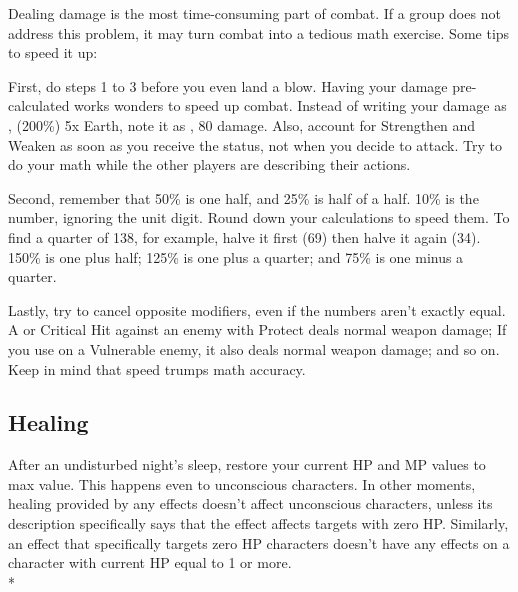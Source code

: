 \begin{multicols}{2}
\begin{boco}
Dealing damage is the most time-consuming part of combat. If a group does not address this problem, it may turn combat into a tedious math exercise. Some tips to speed it up:

First, do steps 1 to 3 before you even land a blow. Having your damage pre-calculated works wonders to speed up combat. Instead of writing your damage as , (200\%) 5x Earth, note it as , 80 damage. Also, account for Strengthen and Weaken as soon as you receive the status, not when you decide to attack. Try to do your math while the other players are describing their actions.

Second, remember that 50\% is one half, and 25\% is half of a half. 10\% is the number, ignoring the unit digit. Round down your calculations to speed them. To find a quarter of 138, for example, halve it first (69) then halve it again (34). 150\% is one plus half; 125\% is one plus a quarter; and 75\% is one minus a quarter.

Lastly, try to cancel opposite modifiers, even if the numbers aren't exactly equal. A  or Critical Hit against an enemy with Protect deals normal weapon damage; If you use  on a Vulnerable enemy, it also deals normal weapon damage; and so on. Keep in mind that speed trumps math accuracy.
\end{boco}

\subsection{Healing}\label{subsec:heal}
After an undisturbed night's sleep, restore your current HP and MP values to max value. This happens even to unconscious characters. In other moments, healing provided by any effects doesn’t affect unconscious characters, unless its description specifically says that the effect affects targets with zero HP\@. Similarly, an effect that specifically targets zero HP characters doesn’t have any effects on a character with current HP equal to 1 or more.\\*
\end{multicols}

